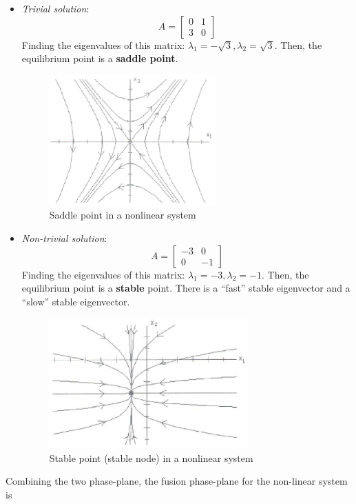 \begin{itemize}
\item {\it Trivial solution}:
  \begin{equation}
    \label{eq:111}
  A = \left[
    \begin{array}{cc}
      0 &  1 \\
      3 & 0
    \end{array} 
    \right]    
  \end{equation}
  Finding the eigenvalues of this matrix: $\lambda_1 = -\sqrt{3},
  \lambda_2 = \sqrt{3}$. Then, the equilibrium point is a {\bf saddle point}.
\begin{figure}[htb]
  \centerline{\includegraphics[height=5cm]{./images/saddle_nonlinear.eps}}
  \caption{Saddle point in a nonlinear system}\label{fig:saddle_nonlinear}
\end{figure}

\item {\it Non-trivial solution}:
  \begin{equation}
    \label{eq:1111}
  A = \left[
    \begin{array}{cc}
      -3 &  0 \\
      0 & -1
    \end{array} 
    \right]    
  \end{equation}
  Finding the eigenvalues of this matrix: $\lambda_1 = -3, \lambda_2 =
  -1$. Then, the equilibrium point is a {\bf stable} point. There is a
  ``fast'' stable eigenvector and a ``slow'' stable eigenvector.
\begin{figure}[htb]
  \centerline{\includegraphics[height=5cm]{./images/stable_nonlinear.eps}}
  \caption{Stable point (stable node) in a nonlinear system}
  \label{fig:stable_nonlinear}
\end{figure}
\end{itemize}
Combining the two phase-plane, the fusion phase-plane for the
non-linear system is

